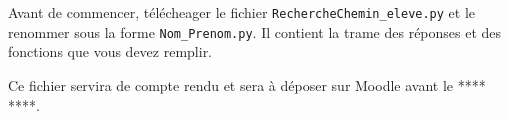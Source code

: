 \documentclass[t,10pt]{article}
\begin{document}
\enteteinfo

\graphicspath{{images}}

\setcounter{numques}{0}

\proffalse

Avant de commencer, télécheager le fichier \texttt{RechercheChemin\_eleve.py} et le renommer sous la forme \texttt{Nom\_Prenom.py}. Il contient la trame des réponses et des fonctions que vous devez remplir. 

Ce fichier servira de compte rendu et sera à déposer sur Moodle avant le **** ****.

\graphicspath{{../../../Informatique/Exercices/S1_06_Gloutons/06_RechercheChemin/}}

\end{document}
